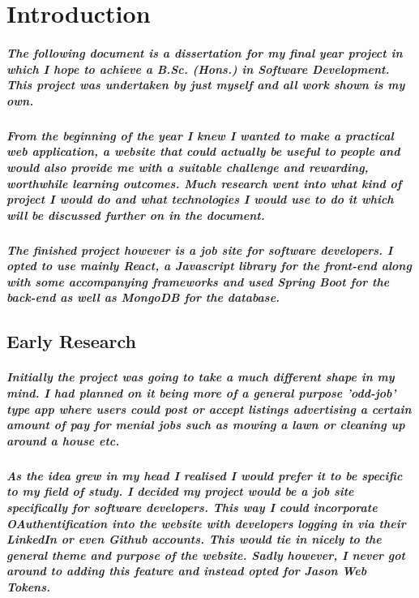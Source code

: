 \chapter{Introduction}
\paragraph{The following document is a dissertation for my final year project in which I hope to achieve a B.Sc. (Hons.) in Software Development. This project was undertaken by just myself and all work shown is my own.}
\paragraph{From the beginning of the year I knew I wanted to make a practical web application, a website that could actually be useful to people and would also provide me with a suitable challenge and rewarding, worthwhile learning outcomes. Much research went into what kind of project I would do and what technologies I would use to do it which will be discussed further on in the document.}
\paragraph{The finished project however is a job site for software developers. I opted to use mainly React, a Javascript library for the front-end along with some accompanying frameworks and used Spring Boot for the back-end as well as MongoDB for the database.}

\section{Early Research}
\paragraph{Initially the project was going to take a much different shape in my mind. I had planned on it being more of a general purpose 'odd-job' type app where users could post or accept listings advertising a certain amount of pay for menial jobs such as mowing a lawn or cleaning up around a house etc.}
\paragraph{As the idea grew in my head I realised I would prefer it to be specific to my field of study. I decided my project would be a job site specifically for software developers. This way I could incorporate OAuthentification into the website with developers logging in via their LinkedIn or even Github accounts. This would tie in nicely to the general theme and purpose of the website. Sadly however, I never got around to adding this feature and instead opted for Jason Web Tokens.}
